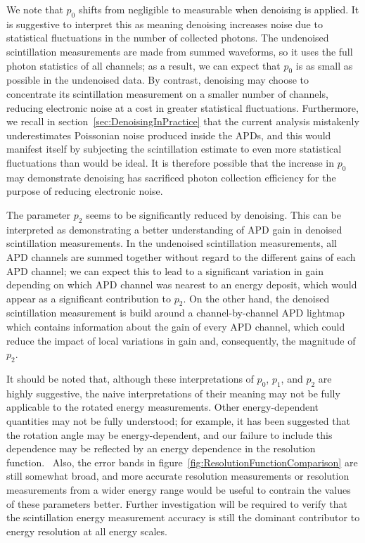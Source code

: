 We note that $p_0$ shifts from negligible to measurable when denoising is applied.  It is suggestive to interpret this as meaning denoising increases noise due to statistical fluctuations in the number of collected photons.  The undenoised scintillation measurements are made from summed waveforms, so it uses the full photon statistics of all channels; as a result, we can expect that $p_0$ is as small as possible in the undenoised data.  By contrast, denoising may choose to concentrate its scintillation measurement on a smaller number of channels, reducing electronic noise at a cost in greater statistical fluctuations.  Furthermore, we recall in section~\ref{sec:DenoisingInPractice} that the current analysis mistakenly underestimates Poissonian noise produced inside the APDs, and this would manifest itself by subjecting the scintillation estimate to even more statistical fluctuations than would be ideal.  It is therefore possible that the increase in $p_0$ may demonstrate denoising has sacrificed photon collection efficiency for the purpose of reducing electronic noise.

The parameter $p_2$ seems to be significantly reduced by denoising.  This can be interpreted as demonstrating a better understanding of APD gain in denoised scintillation measurements.  In the undenoised scintillation measurements, all APD channels are summed together without regard to the different gains of each APD channel; we can expect this to lead to a significant variation in gain depending on which APD channel was nearest to an energy deposit, which would appear as a significant contribution to $p_2$.  On the other hand, the denoised scintillation measurement is build around a channel-by-channel APD lightmap which contains information about the gain of every APD channel, which could reduce the impact of local variations in gain and, consequently, the magnitude of $p_2$.

It should be noted that, although these interpretations of $p_0$, $p_1$, and $p_2$ are highly suggestive, the naive interpretations of their meaning may not be fully applicable to the rotated energy measurements.  Other energy-dependent quantities may not be fully understood; for example, it has been suggested that the rotation angle may be energy-dependent, and our failure to include this dependence may be reflected by an energy dependence in the resolution function.~\cite{EnergyDocumentRun2a}  Also, the error bands in figure~\ref{fig:ResolutionFunctionComparison} are still somewhat broad, and more accurate resolution measurements or resolution measurements from a wider energy range would be useful to contrain the values of these parameters better.  Further investigation will be required to verify that the scintillation energy measurement accuracy is still the dominant contributor to energy resolution at all energy scales.

